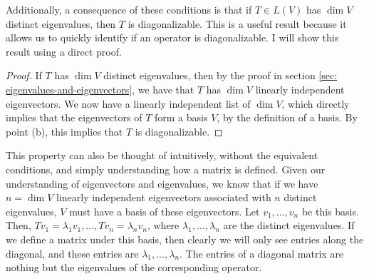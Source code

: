 \documentclass{article}
\theoremstyle{definition}
\begin{document}
Additionally, a consequence of these conditions is that if $T \in L(V)$ has $\dim V$ distinct eigenvalues, then $T$ is diagonalizable. This is a useful result because it allows us to quickly identify if an operator is diagonalizable. I will show this result using a direct proof.
\begin{proof}
    If $T$ has $\dim V$ distinct eigenvalues, then by the proof in section \ref{sec: eigenvalues-and-eigenvectors}, we have that $T$ has $\dim V$ linearly independent eigenvectors. We now have a linearly independent list of $\dim V$, which directly implies that the eigenvectors of $T$ form a basis $V$, by the definition of a basis. By point (b), this implies that $T$ is diagonalizable.
\end{proof}
This property can also be thought of intuitively, without the equivalent conditions, and simply understanding how a matrix is defined. Given our understanding of eigenvectors and eigenvalues, we know that if we have $n = \dim V$ linearly independent eigenvectors associated with $n$ distinct eigenvalues, $V$ must have a basis of these eigenvectors. Let $v_1, \dots, v_n$ be this basis. Then, $Tv_1 = \lambda_1v_1, \dots, Tv_n = \lambda_nv_n$, where $\lambda_1, \dots, \lambda_n$ are the distinct eigenvalues. If we define a matrix under this basis, then clearly we will only see entries along the diagonal, and these entries are $\lambda_1, \dots, \lambda_n$. The entries of a diagonal matrix are nothing but the eigenvalues of the corresponding operator.
\end{document}
